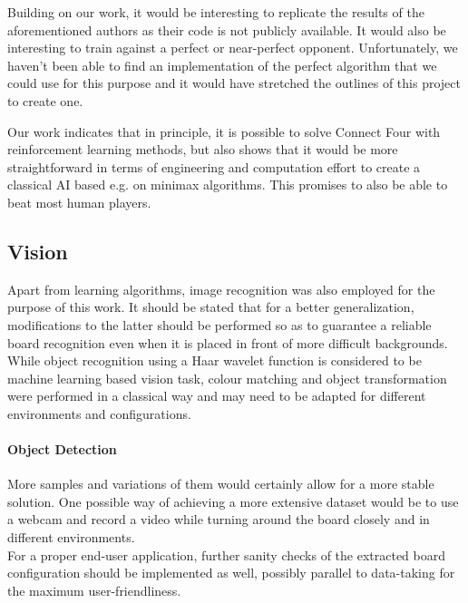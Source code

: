 \documentclass[10pt,twocolumn,letterpaper]{article}
\begin{document}
Building on our work, it would be interesting to replicate the results of the aforementioned
authors as their code is not publicly available.
It would also be interesting to train against a perfect or near-perfect opponent.
Unfortunately, we haven't been able to find an implementation of the perfect algorithm that we could use for this purpose and it would have stretched the outlines of this project to create one.

Our work indicates that in principle, it is possible to solve Connect Four with
reinforcement learning methods, but also shows that it would be more straightforward in terms of engineering and computation effort to create a classical AI based e.g. on minimax algorithms. This promises to also be able to beat most human players.

\subsection{Vision}
Apart from learning algorithms, image recognition was also employed for the purpose of this work. It should be stated that for a better generalization, modifications to the latter should be performed so as to guarantee a reliable board recognition even when it is placed in front of more difficult backgrounds.
While object recognition using a Haar wavelet function is considered to be machine learning based vision task, colour matching and object transformation were performed in a classical way and may need to be adapted for different environments and configurations.
\paragraph{Object Detection}
More samples and variations of them would certainly allow for a more stable solution. 
One possible way of achieving a more extensive dataset would be to use a webcam and record a video while turning around the board closely and in different environments.\\
For a proper end-user application, further sanity checks of the extracted board configuration should be implemented as well, possibly parallel to data-taking for the maximum user-friendliness.


{\small
\printbibliography
}
\end{document}
